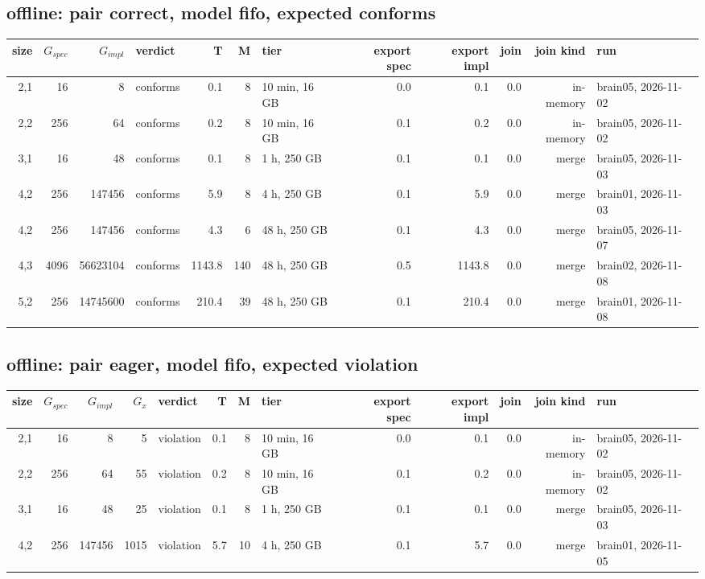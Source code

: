 \documentclass[10pt]{article}
\begin{document}
\subsection*{offline: pair \textsf{correct}, model fifo, expected conforms}
\begin{longtable}{@{}rrrlrrlrrrrl@{}}
\toprule
size & $G_{\mathit{spec}}$ & $G_{\mathit{impl}}$ & verdict & T & M & tier & export spec & export impl & join & join kind & run \\
\midrule
\endhead
\color{red} 2,1 & 16 & 8 & conforms & 0.1 & 8 & 10 min, 16 GB & 0.0 & 0.1 & 0.0 & in-memory & brain05, 2026-11-02 \\
\color{red} 2,2 & 256 & 64 & conforms & 0.2 & 8 & 10 min, 16 GB & 0.1 & 0.2 & 0.0 & in-memory & brain05, 2026-11-02 \\
\color{blue} 3,1 & 16 & 48 & conforms & 0.1 & 8 & 1 h, 250 GB & 0.1 & 0.1 & 0.0 & merge & brain05, 2026-11-03 \\
\color{blue} 4,2 & 256 & 147456 & conforms & 5.9 & 8 & 4 h, 250 GB & 0.1 & 5.9 & 0.0 & merge & brain01, 2026-11-03 \\
\color{blue} 4,2 & 256 & 147456 & conforms & 4.3 & 6 & 48 h, 250 GB & 0.1 & 4.3 & 0.0 & merge & brain05, 2026-11-07 \\
\color{blue} 4,3 & 4096 & 56623104 & conforms & 1143.8 & 140 & 48 h, 250 GB & 0.5 & 1143.8 & 0.0 & merge & brain02, 2026-11-08 \\
\color{blue} 5,2 & 256 & 14745600 & conforms & 210.4 & 39 & 48 h, 250 GB & 0.1 & 210.4 & 0.0 & merge & brain01, 2026-11-08 \\
\bottomrule
\end{longtable}
\subsection*{offline: pair \textsf{eager}, model fifo, expected violation}
\begin{longtable}{@{}rrrrlrrlrrrrl@{}}
\toprule
size & $G_{\mathit{spec}}$ & $G_{\mathit{impl}}$ & $G_x$ & verdict & T & M & tier & export spec & export impl & join & join kind & run \\
\midrule
\endhead
\color{red} 2,1 & 16 & 8 & 5 & violation & 0.1 & 8 & 10 min, 16 GB & 0.0 & 0.1 & 0.0 & in-memory & brain05, 2026-11-02 \\
\color{red} 2,2 & 256 & 64 & 55 & violation & 0.2 & 8 & 10 min, 16 GB & 0.1 & 0.2 & 0.0 & in-memory & brain05, 2026-11-02 \\
\color{blue} 3,1 & 16 & 48 & 25 & violation & 0.1 & 8 & 1 h, 250 GB & 0.1 & 0.1 & 0.0 & merge & brain05, 2026-11-03 \\
\color{blue} 4,2 & 256 & 147456 & 1015 & violation & 5.7 & 10 & 4 h, 250 GB & 0.1 & 5.7 & 0.0 & merge & brain01, 2026-11-05 \\
\bottomrule
\end{longtable}
\end{document}

